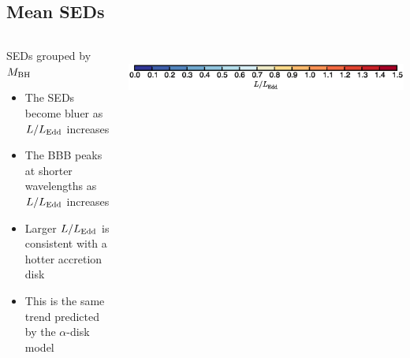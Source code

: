 \documentclass[landscape,9pt]{beamer}
\begin{document}

\subsection{Mean SEDs}
\begin{frame}
	\begin{columns}
	\begin{column}{.35\textwidth}
		\begin{block}{SEDs grouped by $M_{\rm BH}$}
		\begin{itemize}
			\item The SEDs become bluer as $L/L_{\rm Edd}$ increases
			\item The BBB peaks at shorter wavelengths as $L/L_{\rm Edd}$ increases
			\item Larger $L/L_{\rm Edd}$ is consistent with a hotter accretion disk
			\item This is the same trend predicted by the $\alpha$-disk model
		\end{itemize}
		\end{block}
	\end{column}
	\begin{column}{.75\textwidth}
		\\
		\hspace{3mm}\includegraphics[width=.95\textwidth]{../images/BH/Lf_colorbar}
	\end{column}
	\end{columns}
\end{frame}
\end{document}

